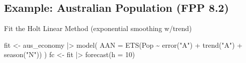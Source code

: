 \documentclass[
  letterpaper,
  DIV=11,
  numbers=noendperiod]{scrartcl}
\newenvironment{Shaded}{\begin{snugshade}}{\end{snugshade}}
\newcommand{\AttributeTok}[1]{\textcolor[rgb]{0.40,0.45,0.13}{#1}}
\newcommand{\DecValTok}[1]{\textcolor[rgb]{0.68,0.00,0.00}{#1}}
\newcommand{\FunctionTok}[1]{\textcolor[rgb]{0.28,0.35,0.67}{#1}}
\newcommand{\NormalTok}[1]{\textcolor[rgb]{0.00,0.23,0.31}{#1}}
\newcommand{\OtherTok}[1]{\textcolor[rgb]{0.00,0.23,0.31}{#1}}
\newcommand{\SpecialCharTok}[1]{\textcolor[rgb]{0.37,0.37,0.37}{#1}}
\newcommand{\StringTok}[1]{\textcolor[rgb]{0.13,0.47,0.30}{#1}}
\begin{document}
\subsection{Example: Australian Population (FPP
8.2)}\label{example-australian-population-fpp-8.2-1}

Fit the Holt Linear Method (exponential smoothing w/trend)

\begin{Shaded}
\begin{Highlighting}[]
\NormalTok{fit }\OtherTok{\textless{}{-}}\NormalTok{ aus\_economy }\SpecialCharTok{|\textgreater{}}
  \FunctionTok{model}\NormalTok{(}
    \AttributeTok{AAN =} \FunctionTok{ETS}\NormalTok{(Pop }\SpecialCharTok{\textasciitilde{}} \FunctionTok{error}\NormalTok{(}\StringTok{"A"}\NormalTok{) }\SpecialCharTok{+} \FunctionTok{trend}\NormalTok{(}\StringTok{"A"}\NormalTok{) }\SpecialCharTok{+} \FunctionTok{season}\NormalTok{(}\StringTok{"N"}\NormalTok{))}
\NormalTok{  )}
\NormalTok{fc }\OtherTok{\textless{}{-}}\NormalTok{ fit }\SpecialCharTok{|\textgreater{}} \FunctionTok{forecast}\NormalTok{(}\AttributeTok{h =} \DecValTok{10}\NormalTok{)}
\end{Highlighting}
\end{Shaded}
\end{document}
